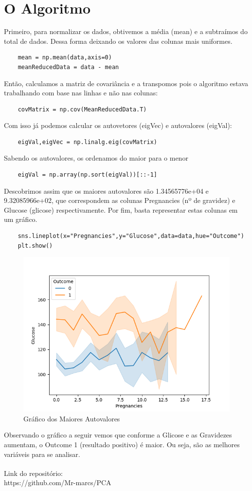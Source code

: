 \documentclass{article}
\begin{document}
\section{O Algoritmo}
Primeiro, para normalizar os dados, obtivemos a média (mean) e a subtraímos do total de dados. Dessa forma deixando os valores das colunas mais uniformes.
\begin{verbatim}
    mean = np.mean(data,axis=0)
    meanReducedData = data - mean
\end{verbatim}
Então, calculamos a matriz de covariância e a transpomos pois o algoritmo estava trabalhando com base nas linhas e não nas colunas:
\begin{verbatim}
    covMatrix = np.cov(MeanReducedData.T)
\end{verbatim}
Com isso já podemos calcular os autovetores (eigVec) e autovalores (eigVal):
\begin{verbatim}
    eigVal,eigVec = np.linalg.eig(covMatrix)
\end{verbatim}
Sabendo os autovalores, os ordenamos do maior para o menor
\begin{verbatim}
    eigVal = np.array(np.sort(eigVal))[::-1]
\end{verbatim}
Descobrimos assim que os maiores autovalores são 1.34565776e+04 e 9.32085966e+02, que correspondem as colunas Pregnancies (nº de gravidez) e Glucose (glicose) respectivamente.
Por fim, basta representar estas colunas em um gráfico.
\begin{verbatim}
    sns.lineplot(x="Pregnancies",y="Glucose",data=data,hue="Outcome")
    plt.show()
\end{verbatim}
\begin{figure}
    \centering 
    \includegraphics{Figure_1.png}
    \caption{Gráfico dos Maiores Autovalores}
    \label{fig:my_label}
\end{figure}
Observando o gráfico a seguir vemos que conforme a Glicose e as Gravidezes aumentam, o Outcome 1 (resultado positivo) é maior. Ou seja, são as melhores variáveis para se analisar.\\
\\
Link do repositório:\\
https://github.com/Mr-marcs/PCA
\end{document}
